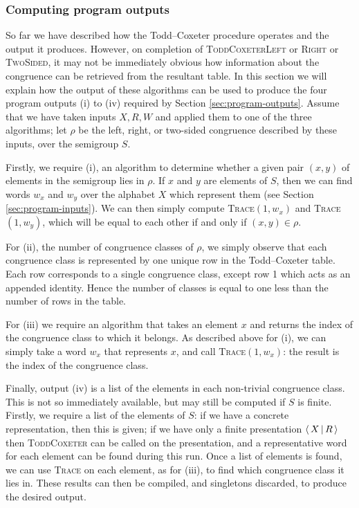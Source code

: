 \subsubsection{Computing program outputs}
\label{sec:tc-output}
So far we have described how the Todd--Coxeter procedure operates and the output
it produces.  However, on completion of \textsc{ToddCoxeterLeft} or
\textsc{Right} or \textsc{TwoSided}, it may not be immediately obvious how
information about the congruence can be retrieved from the resultant table.  In
this section we will explain how the output of these algorithms can be used to
produce the four program outputs (i) to (iv) required by Section
\ref{sec:program-outputs}.  Assume that we have taken inputs $X,R,W$ and applied
them to one of the three algorithms; let $\rho$ be the left, right, or two-sided
congruence described by these inputs, over the semigroup $S$.

Firstly, we require (i), an algorithm to determine whether a given pair $(x,y)$
of elements in the semigroup lies in $\rho$.  If $x$ and $y$ are elements of
$S$, then we can find words $w_x$ and $w_y$ over the alphabet $X$ which
represent them (see Section \ref{sec:program-inputs}).  We can then simply
compute \textsc{Trace}$(1, w_x)$ and \textsc{Trace}$(1, w_y)$, which will be
equal to each other if and only if $(x,y) \in \rho$.

For (ii), the number of congruence classes of $\rho$, we simply observe that
each congruence class is represented by one unique row in the Todd--Coxeter
table.  Each row corresponds to a single congruence class, except row 1 which
acts as an appended identity.  Hence the number of classes is equal to one less
than the number of rows in the table.

For (iii) we require an algorithm that takes an element $x$ and returns the
index of the congruence class to which it belongs.  As described above for (i),
we can simply take a word $w_x$ that represents $x$, and call
\textsc{Trace}$(1, w_x)$: the result is the index of the congruence class.

Finally, output (iv) is a list of the elements in each non-trivial congruence
class.  This is not so immediately available, but may still be computed if $S$
is finite.  Firstly, we require a list of the elements of $S$: if we have a
concrete representation, then this is given; if we have only a finite
presentation $\left\langle \, X \, \middle| \, R \, \right\rangle$ then \textsc{ToddCoxeter} can be called on the
presentation, and a representative word for each element can be found during
this run.  Once a list of elements is found, we can use \textsc{Trace} on each
element, as for (iii), to find which congruence class it lies in.  These results
can then be compiled, and singletons discarded, to produce the desired output.

